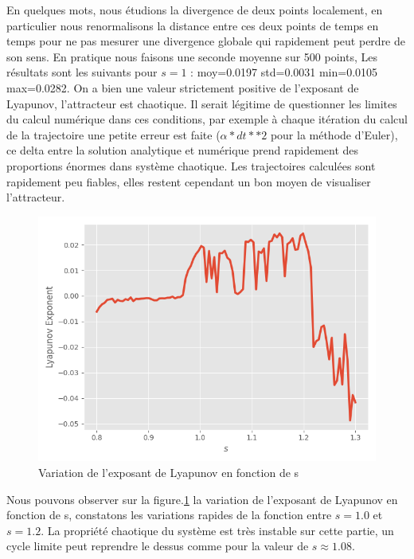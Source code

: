 \documentclass{wsdcr}
\begin{document}
En quelques mots, nous étudions la divergence de deux points localement, en particulier nous renormalisons la distance entre ces deux points de temps en temps pour ne pas mesurer une divergence globale qui rapidement peut perdre de son sens. En pratique nous faisons une seconde moyenne sur 500 points, Les résultats sont les suivants pour $s=1$ : moy=0.0197 std=0.0031 min=0.0105 max=0.0282. On a bien une valeur strictement positive de l'exposant de Lyapunov, l'attracteur est chaotique. Il serait légitime de questionner les limites du calcul numérique dans ces conditions, par exemple à chaque itération du calcul de la trajectoire une petite erreur est faite ($\alpha*dt**2$ pour la méthode d'Euler), ce delta entre la solution analytique et numérique prend rapidement des proportions énormes dans système chaotique. Les trajectoires calculées sont rapidement peu fiables, elles restent cependant un bon moyen de visualiser l'attracteur.
\begin{figure}
    \centering
    \includegraphics[width=\linewidth]{fig/lv4_LE.png}
    \caption{Variation de l'exposant de Lyapunov en fonction de s}
    \label{fig:les}
\end{figure}
Nous pouvons observer sur la figure.\ref{fig:les} la variation de l'exposant de Lyapunov en fonction de s, constatons les variations rapides de la fonction entre $s=1.0$ et $s=1.2$. La propriété chaotique du système est très instable sur cette partie, un cycle limite peut reprendre le dessus comme pour la valeur de $s\approx 1.08$.
\end{document}
